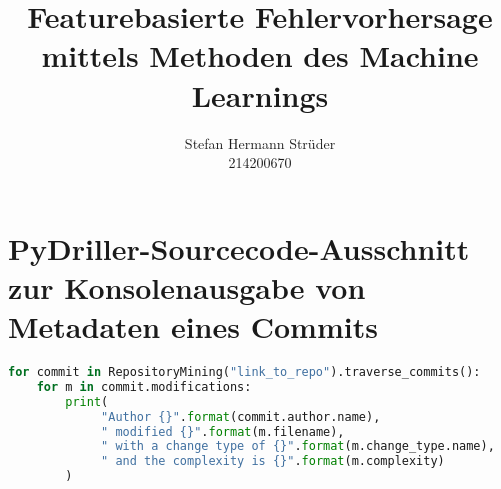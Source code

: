 \documentclass[master,twoside,extern,palatino]{rgseThesis}
\author{Stefan Hermann Strüder\par{}214200670}
\title{Featurebasierte Fehlervorhersage mittels Methoden des Machine Learnings}
\begin{document}

    \maketitle

    
    
    
    
    

    \tableofcontents
    \cleardoublepage

    \listoffigures   %
    \cleardoublepage
    
    \listoftables   %
    \cleardoublepage


    

    

    
    
    
    
    
    
    
    
    
    
    
    


    \printbibliography[heading=bibintoc]

\appendix

\chapter{PyDriller-Sourcecode-Ausschnitt zur Konsolenausgabe von Metadaten eines Commits}
\label{appendix4}

\begin{lstlisting}[language=Python, caption=Beispielhafter PyDriller-Code zur Ausgabe von Metadaten von Commits, frame=single, label=pydriller]
for commit in RepositoryMining("link_to_repo").traverse_commits(): 
	for m in commit.modifications: 
		print( 
		     "Author {}".format(commit.author.name),
		     " modified {}".format(m.filename),
		     " with a change type of {}".format(m.change_type.name),
		     " and the complexity is {}".format(m.complexity)
		)
\end{lstlisting}
\end{document}
